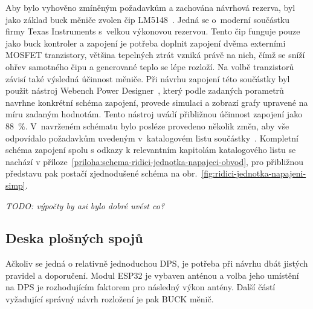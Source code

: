         
        Aby bylo vyhověno zmíněným požadavkům a zachována návrhová rezerva, byl jako základ buck měniče zvolen čip LM5148~\cite{lm5148-datasheet}. Jedná se o~moderní součástku firmy Texas Instruments s~velkou výkonovou rezervou. Tento čip funguje pouze jako buck kontroler a zapojení je potřeba doplnit zapojení dvěma externími MOSFET tranzistory, většina tepelných ztrát vzniká právě na nich, čímž se sníží ohřev samotného čipu a generované teplo se lépe rozloží. Na volbě tranzistorů závisí také výsledná účinnost měniče. Při návrhu zapojení této součástky byl použit nástroj Webench Power Designer~\cite{webench-power-designer}, který podle zadaných porametrů navrhne konkrétní schéma zapojení, provede simulaci a zobrazí grafy upravené na míru zadaným hodnotám. Tento nástroj uvádí přibližnou účinnost zapojení jako \qty{88}{\percent}. V~navrženém schématu bylo posléze provedeno několik změn, aby vše odpovídalo požadavkům uvedeným v~katalogovém listu součástky~\cite{lm5148-datasheet}. Kompletní schéma zapojení spolu s odkazy k relevantním kapitolám katalogového listu se nachází v příloze~\ref{priloha:schema-ridici-jednotka-napajeci-obvod}, pro přibližnou představu pak postačí zjednodušené schéma na obr.~\ref{fig:ridici-jednotka-napajeni-simp}. 

        \textit{TODO: výpočty by asi bylo dobré uvést co?}

    \subsection{Deska plošných spojů}
        Ačkoliv se jedná o relativně jednoduchou DPS, je potřeba při návrhu dbát jistých pravidel a doporučení. Modul ESP32 je vybaven anténou a volba jeho umístění na DPS je rozhodujícím faktorem pro následný výkon antény. Další částí vyžadující správný návrh rozložení je pak BUCK měnič. 
        
